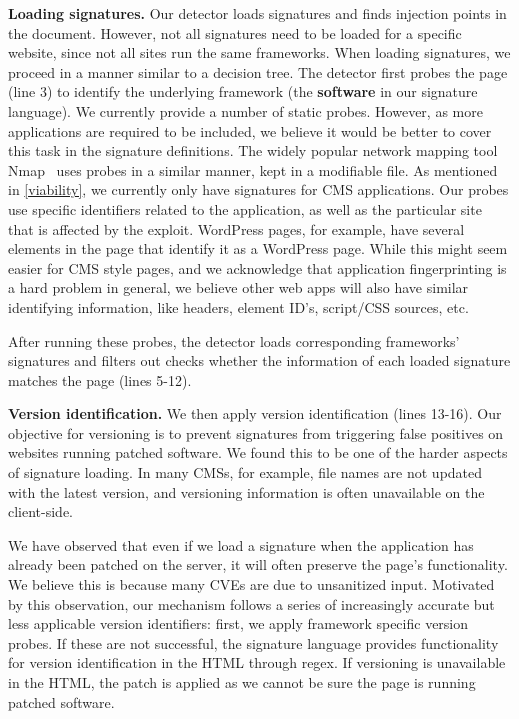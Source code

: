 \textbf{Loading signatures.}
Our detector loads signatures and finds injection points in the document. However, not all signatures need to be loaded for a specific website, since not all sites run the same frameworks. When loading signatures, we proceed in a manner similar to a decision tree. The detector first probes the page (line 3) to identify the underlying framework (the \textbf{software} in our signature language). We currently provide a number of static probes. However, as more applications are required to be included, we believe it would be better to cover this task in the signature definitions. The widely popular network mapping tool Nmap~\cite{nMap} uses probes in a similar manner, kept in a modifiable file. As mentioned in \autoref{viability}, we currently only have signatures for CMS applications. Our probes use specific identifiers related to the application, as well as the particular site that is affected by the exploit. WordPress pages, for example, have several elements in the page that identify it as a WordPress page. While this might seem easier for CMS style pages, and we acknowledge that application fingerprinting is a hard problem in general, we believe other web apps will also have similar identifying information, like headers, element ID's, script/CSS sources, etc. 

After running these probes, the detector loads corresponding frameworks' signatures and filters out checks whether the information of each loaded signature matches the page (lines 5-12).

\textbf{Version identification.} We then apply version identification
(lines 13-16). Our objective for versioning is to prevent signatures from
triggering false positives on websites running patched software. We
found this to be one of the harder aspects of signature loading. In
many \acp{CMS}, for example, file names are not updated with the
latest version, and versioning information is often unavailable on the client-side.

We have observed that even if we load a signature when the
application has already been patched on the server, it will often
preserve the page's functionality. We believe this is because many CVEs are due to
unsanitized input. Motivated by this observation, our mechanism
follows a series of increasingly accurate but less applicable version
identifiers: first, we apply framework specific version probes. If
these are not successful, the signature language provides
functionality for version identification in the HTML through regex. If
versioning is unavailable in the HTML, the patch is applied
as we cannot be sure the page is running patched
software. %

